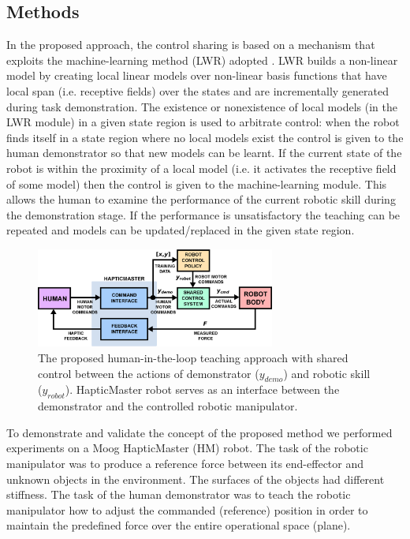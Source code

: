 \subsection{Methods}
In the proposed approach, the control sharing is based on a mechanism that exploits the machine-learning method (LWR) adopted \cite{Schaal1998,Vijayakumar2005}. LWR builds a non-linear model by creating local linear models over non-linear basis functions that have local span (i.e. receptive fields) over the states and are incrementally generated during task demonstration. The existence or nonexistence of local models (in the LWR module) in a given state region is used to arbitrate control: when the robot finds itself in a state region where no local models exist the control is given to the human demonstrator so that new models can be learnt. If the current state of the robot is within the proximity of a local model (i.e. it activates the receptive field of some model) then the control is given to the machine-learning module. This allows the human to examine the performance of the current robotic skill during the demonstration stage. If the performance is unsatisfactory the teaching can be repeated and models can be updated/replaced in the given state region.
\begin{figure}[!t]
  \centering
  \includegraphics[width=0.70\textwidth]{Luka/scheme.eps}
  \caption{The proposed human-in-the-loop teaching approach with shared control between the actions of demonstrator ($y_{demo}$) and robotic skill ($y_{robot}$). HapticMaster robot serves as an interface between the demonstrator and the controlled robotic manipulator.}
  \label{fig:scheme}
  \vspace{-4 mm}
\end{figure}

To demonstrate and validate the concept of the proposed method we performed experiments on a Moog HapticMaster (HM) robot. The task of the robotic manipulator was to produce a reference force between its end-effector and unknown objects in the environment. The surfaces of the objects had different stiffness. The task of the human demonstrator was to teach the robotic manipulator how to adjust the commanded (reference) position in order to maintain the predefined force over the entire operational space (plane).

